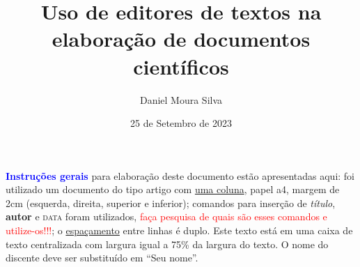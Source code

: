\documentclass[a4paper]{article}
\title{Uso de editores de textos na elabora\c{c}\~{a}o de documentos cient\'{i}ficos}
\author{Daniel Moura Silva}
\date{25 de Setembro de 2023}
\begin{document}
\maketitle

\begin{center}
    \begin{minipage}{0.75\textwidth}
\textbf{{\textcolor{blue}{Instru\c{c}\~{o}es gerais}}} para elabora\c{c}\~{a}o deste documento est\~{a}o apresentadas aqui: foi utilizado 
um documento do tipo artigo com \underline{uma coluna}, papel a4, margem de 2cm (esquerda, direita, superior e inferior); 
comandos para inser\c{c}\~{a}o de \textit{t\'{i}tulo}, \textbf{autor} e \textsc{data} foram utilizados, {\textcolor{red}{fa\c{c}a pesquisa de quais s\~{a}o 
esses comandos e utilize-os!!!}}; o \underline{espa\c{c}amento} entre linhas \'{e} duplo. Este texto est\'{a} em uma caixa de 
texto centralizada com largura igual a 75\% da largura do texto. O nome do discente deve ser substitu\'{i}do em “Seu nome”. {\color{red}}
    \end{minipage}
\end{center}
\end{document}
